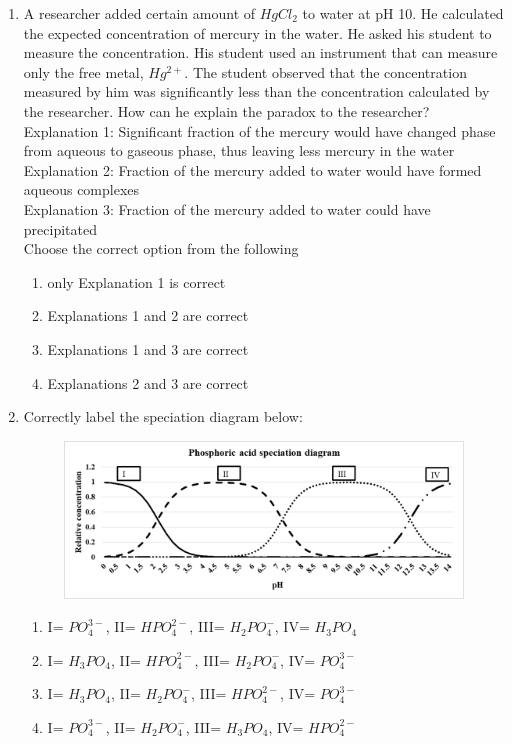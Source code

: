 \documentclass[journal]{IEEEtran}
\begin{document}
\begin{enumerate}[resume]
\item A researcher added certain amount of $HgCl_2$ to water at pH 10. He calculated the expected concentration of mercury in the water. He asked his student to measure the concentration. His student used an instrument that can measure only the free metal, $Hg^{2+}$. The student observed that the concentration measured by him was significantly less than the concentration calculated by the researcher. How can he explain the paradox to the researcher? \\
Explanation 1: Significant fraction of the mercury would have changed phase from aqueous to gaseous phase, thus leaving less mercury in the water \\
Explanation 2: Fraction of the mercury added to water would have formed aqueous complexes \\
Explanation 3: Fraction of the mercury added to water could have precipitated \\
Choose the correct option from the following
\hfill{}
\begin{enumerate}
\item only Explanation 1 is correct
\item Explanations 1 and 2 are correct
\item Explanations 1 and 3 are correct
\item Explanations 2 and 3 are correct
\end{enumerate}

\item Correctly label the speciation diagram below:
\hfill{}
\begin{figure}[H]
    \centering
    \includegraphics[width=\columnwidth]{figs/fig11.png}
    \label{fig11}
\end{figure}
\begin{enumerate}
\item I= $PO_4^{3-}$, II= $HPO_4^{2-}$, III= $H_2PO_4^-$, IV= $H_3PO_4$
\item I= $H_3PO_4$, II= $HPO_4^{2-}$, III= $H_2PO_4^-$, IV= $PO_4^{3-}$
\item I= $H_3PO_4$, II= $H_2PO_4^-$, III= $HPO_4^{2-}$, IV= $PO_4^{3-}$
\item I= $PO_4^{3-}$, II= $H_2PO_4^-$, III= $H_3PO_4$, IV= $HPO_4^{2-}$
\end{enumerate}


\end{enumerate}
\end{document}
